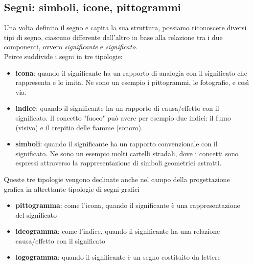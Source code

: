 \documentclass[11pt,a4paper]{article}
\begin{document}
\subsection{Segni: simboli, icone, pittogrammi}
Una volta definito il segno e capita la sua struttura, possiamo riconoscere diversi tipi di segno, ciascuno differente dall'altro in base alla relazione tra i due componenti, ovvero \textit{significante} e \textit{significato}. \\
Peirce suddivide i segni in tre tipologie:
\begin{itemize}
	\item \textbf{icona}: quando il significante ha un rapporto di analogia con il significato che rappresenta e lo imita. Ne sono un esempio i pittogrammi, le fotografie, e così via.
	\item \textbf{indice}: quando il significante ha un rapporto di causa/effetto con il significato. Il concetto "fuoco" può avere per esempio due indici: il fumo (visivo) e il crepitio delle fiamme (sonoro).
	\item \textbf{simboli}: quando il significante ha un rapporto convenzionale con il significato. Ne sono un esempio molti cartelli stradali, dove i concetti sono espressi attraverso la rappresentazione di simboli geometrici astratti.
\end{itemize}
Queste tre tipologie vengono declinate anche nel campo della progettazione grafica in altrettante tipologie di segni grafici
\begin{itemize}
	\item \textbf{pittogramma}: come l'icona, quando il significante è una rappresentazione del significato
	\item \textbf{ideogramma}:  come l'indice, quando il significante ha una relazione causa/effetto con il significato
	\item \textbf{logogramma}: quando il significante è un segno costituito da lettere
\end{itemize}
\end{document}
